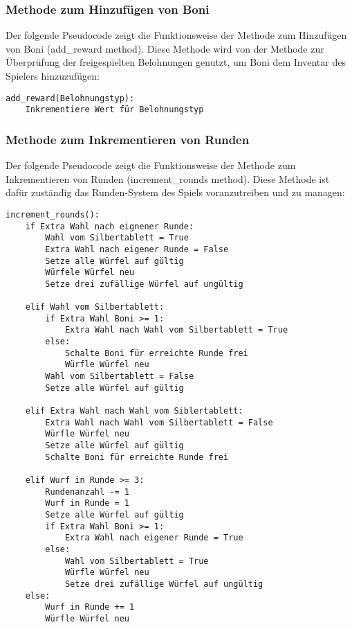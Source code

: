 \subsubsection{Methode zum Hinzufügen von Boni}
\begin{minipage}{\linewidth}
Der folgende Pseudocode zeigt die Funktionsweise der Methode zum Hinzufügen von Boni (add\_reward method). Diese Methode wird von der Methode zur Überprüfung der freigespielten Belohnungen genutzt, um Boni dem Inventar des Spielers hinzuzufügen:
\vspace{0.5cm}
\begin{lstlisting}[caption={Methode zum Hinzufügen von Boni}]
add_reward(Belohnungstyp):
	Inkrementiere Wert für Belohnungstyp
\end{lstlisting}
\end{minipage}

\subsubsection{Methode zum Inkrementieren von Runden}
Der folgende Pseudocode zeigt die Funktionsweise der Methode zum Inkrementieren von Runden (increment\_rounds method). Diese Methode ist dafür zuständig das Runden-System des Spiels voranzutreiben und zu managen:
\vspace{0.5cm}
\begin{lstlisting}[caption={Methode zum Inkrementieren von Runden}]
increment_rounds():
	if Extra Wahl nach eignener Runde:
		Wahl vom Silbertablett = True
		Extra Wahl nach eigener Runde = False
		Setze alle Würfel auf gültig
		Würfele Würfel neu
		Setze drei zufällige Würfel auf ungültig
		
	elif Wahl vom Silbertablett:
		if Extra Wahl Boni >= 1:
			Extra Wahl nach Wahl vom Silbertablett = True
		else:
			Schalte Boni für erreichte Runde frei
			Würfle Würfel neu
		Wahl vom Silbertablett = False
		Setze alle Würfel auf gültig
	
	elif Extra Wahl nach Wahl vom Siblertablett:
		Extra Wahl nach Wahl vom Silbertablett = False
		Würfle Würfel neu
		Setze alle Würfel auf gültig
		Schalte Boni für erreichte Runde frei
	
	elif Wurf in Runde >= 3:
		Rundenanzahl -= 1
		Wurf in Runde = 1
		Setze alle Würfel auf gültig
		if Extra Wahl Boni >= 1:
			Extra Wahl nach eigener Runde = True
		else:
			Wahl vom Silbertablett = True
			Würfle Würfel neu
			Setze drei zufällige Würfel auf ungültig
	else:
		Wurf in Runde += 1
		Würfle Würfel neu
\end{lstlisting}
